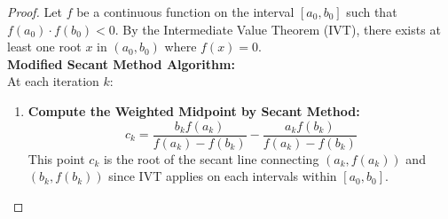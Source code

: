 \documentclass{article}
\begin{document}
\begin{proof}
    Let \( f \) be a continuous function on the interval \( [a_0, b_0] \) such that \( f(a_0) \cdot f(b_0) < 0 \). By the Intermediate Value Theorem (IVT), there exists at least one root \( x \) in \( (a_0, b_0) \) where \( f(x) = 0 \).
    \\
    \textbf{Modified Secant Method Algorithm:}
    \\
    At each iteration \( k \):
    \\
    \begin{enumerate}
        \item \textbf{Compute the Weighted Midpoint by Secant Method:}
        \[
            c_k = \frac{b_k f(a_k) }{f(a_k) - f(b_k)} - \frac{a_k f(b_k)}{f(a_k) - f(b_k)}
        \]
        This point \( c_k \) is the root of the secant line connecting \( (a_k, f(a_k)) \) and \( (b_k, f(b_k)) \) since IVT applies on each intervals within $[a_0, b_0]$.


\end{enumerate}
\end{proof}
\end{document}
